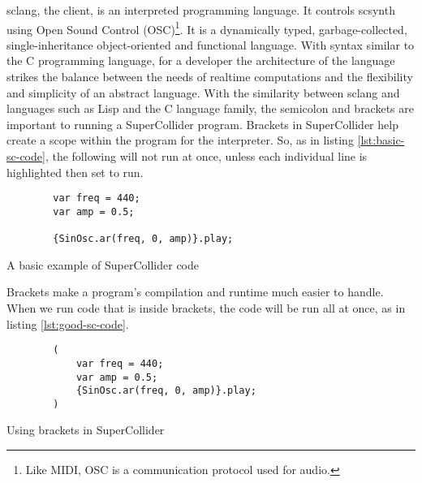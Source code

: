 sclang, the client, is an interpreted programming language. It controls scsynth using Open Sound Control (OSC)\footnote{Like MIDI, OSC is a communication protocol used for audio.}. It is a dynamically typed, garbage-collected, single-inheritance object-oriented and functional language\cite{Wilson_Cottle_Collins_2016}. With syntax similar to the C programming language, for a developer the architecture of the language strikes the balance between the needs of realtime computations and the flexibility and simplicity of an abstract language. With the similarity between sclang and languages such as Lisp and the C language family, the semicolon and brackets are important to running a SuperCollider program. Brackets in SuperCollider help create a scope within the program for the interpreter. So, as in listing \ref{lst:basic-sc-code}, the following will not run at once, unless each individual line is highlighted then set to run.

\begin{listing}
	\begin{lstlisting}
		var freq = 440;
		var amp = 0.5;
		
		{SinOsc.ar(freq, 0, amp)}.play;
	\end{lstlisting}
	\caption{A basic example of SuperCollider code}
	\label{lst:basic-sc-code}
\end{listing}


Brackets make a program's compilation and runtime much easier to handle. When we run code that is inside brackets, the code will be run all at once, as in listing \ref{lst:good-sc-code}. 

\begin{listing}
	\begin{lstlisting}
		(
			var freq = 440;
			var amp = 0.5;
			{SinOsc.ar(freq, 0, amp)}.play;
		)
	\end{lstlisting}
	\caption{Using brackets in SuperCollider}
	\label{lst:good-sc-code}	
\end{listing}